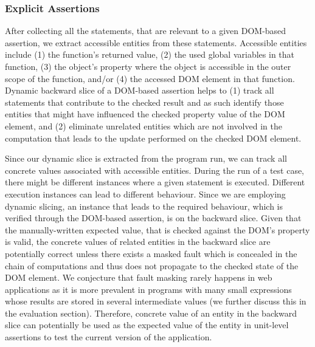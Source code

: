 \subsubsection{Explicit Assertions} \label{Sec:explicitAssertions}
After collecting all the statements, that are relevant to a given DOM-based assertion, we extract accessible entities from these statements.
Accessible entities include (1) the function's returned value, (2) the used global variables in that function, (3) the object's property where the object is accessible in the outer scope of the function, and/or (4) the accessed DOM element in that function. Dynamic backward slice of a DOM-based assertion helps to (1) track all statements that contribute to the checked result and as such identify those entities that might have influenced the checked property value of the DOM element, and (2) eliminate unrelated entities which are not involved in the computation that leads to the update performed on the checked DOM element.

Since our dynamic slice is extracted from the program run, we can track all concrete values associated with accessible entities.
During the run of a test case, there might be different instances where a given statement is executed. Different execution instances can lead to different behaviour. Since we are employing dynamic slicing, an instance that leads to the required behaviour, which is verified through the DOM-based assertion, is on the backward slice. Given that the manually-written expected value, that is checked against the DOM's property is valid, the concrete values of related entities in the backward slice are potentially correct unless there exists a masked fault which is concealed in the chain of computations and thus does not propagate to the checked state of the DOM element. We conjecture that fault masking rarely happens in \javascript web applications as it is more prevalent in programs with many small expressions whose results are stored in several intermediate values (we further discuss this in the evaluation section). Therefore, concrete value of an entity in the backward slice can potentially be used as the expected value of the entity in unit-level assertions to test the current version of the application.
